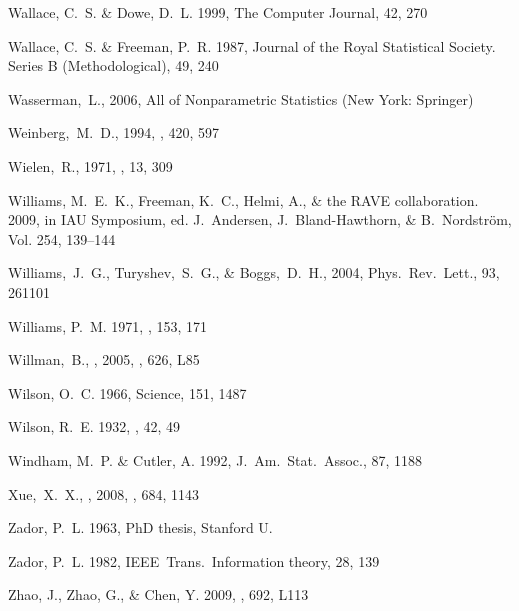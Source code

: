 \begin{thebibliography}{99}
{Wallace}, C.~S. \& {Dowe}, D.~L. 1999, {The Computer Journal}, 42, 270

{Wallace}, C.~S. \& {Freeman}, P.~R. 1987, Journal of the Royal Statistical
  Society. Series B (Methodological), 49, 240

  Wasserman,~L., 2006,
  All of Nonparametric Statistics (New York: Springer)

  Weinberg,~M.~D., 1994,
  \apj, 420, 597

  Wielen,~R., 1971, \aap, 13, 309

{Williams}, M.~E.~K., {Freeman}, K.~C., {Helmi}, A., \& {the RAVE
  collaboration}. 2009, in IAU Symposium, ed. J.~{Andersen},
  J.~{Bland-Hawthorn}, \& B.~{Nordstr{\"o}m}, Vol. 254, 139--144

  Williams,~J.~G., Turyshev,~S.~G., \& Boggs,~D.~H., 2004,
  Phys.~Rev.~Lett., 93, 261101

{Williams}, P.~M. 1971, \mnras, 153, 171

  Willman,~B., \etal, 2005,
  \apjl, 626, L85

{Wilson}, O.~C. 1966, Science, 151, 1487

{Wilson}, R.~E. 1932, \aj, 42, 49

{Windham}, M.~P. \& {Cutler}, A. 1992, {J.~Am.~Stat.~Assoc.}, 87, 1188

 Xue,~X.~X., \etal, 2008, 
  \apj, 684, 1143

{Zador}, P.~L. 1963, PhD thesis, Stanford U.

{Zador}, P.~L. 1982, {IEEE~Trans.~Information theory}, 28, 139

{Zhao}, J., {Zhao}, G., \& {Chen}, Y. 2009, \apjl, 692, L113


\end{thebibliography}
